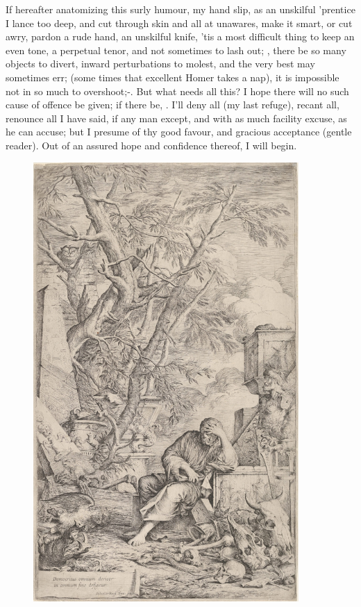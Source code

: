 {If hereafter anatomizing this surly humour, my hand slip, as an
unskilful 'prentice I lance too deep, and cut through skin and all at
unawares, make it smart, or cut awry, pardon a rude hand, an
unskilful knife, 'tis a most difficult thing to keep an even tone, a
perpetual tenor, and not sometimes to lash out; , there be so many objects to divert, inward perturbations
to molest, and the very best may sometimes err;  (some times that excellent Homer takes a nap), it is
impossible not in so much to overshoot;-. But what needs all this? I hope there will no such
cause of offence be given; if there be, . I'll deny all (my last refuge), recant all,
renounce all I have said, if any man except, and with as much facility
excuse, as he can accuse; but I presume of thy good favour, and
gracious acceptance (gentle reader). Out of an assured hope and
confidence thereof, I will begin.

\begin{figure}[p]
  \begingroup
  \centering
  \includegraphics[keepaspectratio,width=0.9\textwidth]{figures/Democritus-in-MeditationDP831915-small.jpg}
  \label{fig:democritusinmeditation}
\end{figure}
\clearpage{}
}
